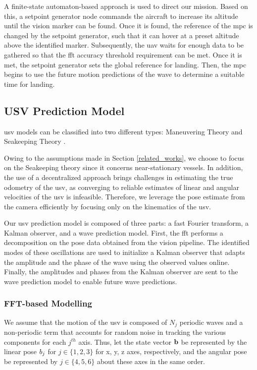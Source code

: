\documentclass[letterpaper, 10 pt, journal, twoside]{IEEEtran}
\begin{document}
A finite-state automaton-based approach is used to direct our mission. Based on this, a setpoint generator node commands the aircraft to increase its altitude until the vision marker can be found. Once it is found, the reference of the \ac{mpc} is changed by the setpoint generator, such that it can hover at a preset altitude above the identified marker. Subsequently, the \ac{uav} waits for enough data to be gathered so that the \ac{fft} accuracy threshold requirement can be met. Once it is met, the setpoint generator sets the global reference for landing. Then, the \ac{mpc} begins to use the future motion predictions of the wave to determine a suitable time for landing.

\subsection{USV Prediction Model}

\ac{usv} models can be classified into two different types: Maneuvering Theory and Seakeeping Theory \cite{fossen2002marine}.

Owing to the assumptions made in Section \ref{related_works}, we choose to focus on the Seakeeping theory since it concerns near-stationary vessels. In addition, the use of a decentralized approach brings challenges in estimating the true odometry of the \ac{usv}, as converging to reliable estimates of linear and angular velocities of the \ac{usv} is infeasible. Therefore, we leverage the pose estimate from the camera efficiently by focusing only on the kinematics of the \ac{usv}.

Our \ac{usv} prediction model is composed of three parts: a fast Fourier transform, a Kalman observer, and a wave prediction model. First, the \ac{fft} performs a decomposition on the pose data obtained from the vision pipeline. The identified modes of these oscillations are used to initialize a Kalman observer that adapts the amplitude and the phase of the wave using the observed values online. Finally, the amplitudes and phases from the Kalman observer are sent to the wave prediction model to enable future wave predictions.

\subsubsection{FFT-based Modelling}
We assume that the motion of the \ac{usv} is composed of $N_j$ periodic waves and a non-periodic term that accounts for random noise in tracking the various components for each $j^{th}$ axis. Thus, let the state vector $\mathbf{b}$ be represented by the linear pose $b_j$ for $j \in \{1,2,3\}$ for x, y, z axes, respectively, and the angular pose be represented by $j \in \{4,5,6\}$ about these axes in the same order. %
\end{document}
